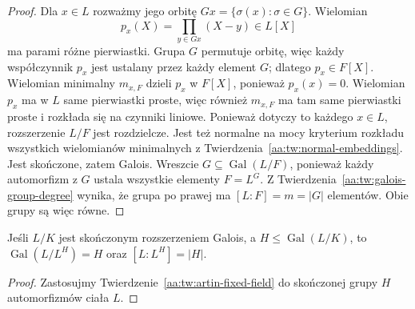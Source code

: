 \begin{proof}
Dla $x\in L$ rozważmy jego orbitę $Gx=\{\sigma(x):\sigma\in G\}$.
Wielomian
\[
p_x(X)=\prod_{y\in Gx}(X-y)\in L[X]
\]
ma parami różne pierwiastki. Grupa $G$ permutuje orbitę,
więc każdy współczynnik $p_x$ jest ustalany przez
każdy element $G$; dlatego $p_x\in F[X]$.
Wielomian minimalny $m_{x,F}$ dzieli $p_x$ w $F[X]$,
ponieważ $p_x(x)=0$. Wielomian $p_x$ ma w $L$ same
pierwiastki proste, więc również $m_{x,F}$ ma tam same
pierwiastki proste i rozkłada się na czynniki liniowe.
Ponieważ dotyczy to każdego $x\in L$, rozszerzenie
$L/F$ jest rozdzielcze. Jest też normalne na mocy
kryterium rozkładu wszystkich wielomianów minimalnych
z Twierdzenia~\ref{aa:tw:normal-embeddings}.
Jest skończone, zatem Galois.
Wreszcie $G\subseteq\operatorname{Gal}(L/F)$, ponieważ
każdy automorfizm z $G$ ustala wszystkie elementy $F=L^G$.
Z Twierdzenia~\ref{aa:tw:galois-group-degree} wynika,
że grupa po prawej ma $[L:F]=m=|G|$ elementów.
Obie grupy są więc równe.
\end{proof}

\begin{wniosek}
\label{aa:wn:artin-recover-group}
Jeśli $L/K$ jest skończonym rozszerzeniem Galois,
a $H\le\operatorname{Gal}(L/K)$, to
$\operatorname{Gal}(L/L^H)=H$ oraz $[L:L^H]=|H|$.
\end{wniosek}
\begin{proof}
Zastosujmy Twierdzenie~\ref{aa:tw:artin-fixed-field}
do skończonej grupy $H$ automorfizmów ciała $L$.
\end{proof}

